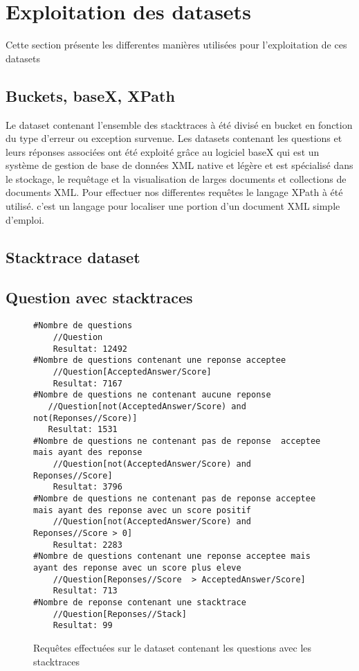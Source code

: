 \section{Exploitation des datasets}
Cette section présente les differentes manières utilisées pour l'exploitation de ces datasets
\subsection{Buckets, baseX, XPath}
Le dataset contenant l'ensemble des stacktraces à été divisé en bucket en fonction du type d'erreur ou exception survenue.
Les datasets contenant les questions et leurs réponses associées ont été exploité grâce au logiciel baseX qui  est un système de gestion de base de données XML native et légère et est spécialisé dans le stockage, le requêtage et la visualisation de larges documents et collections de documents XML.
Pour effectuer nos differentes requêtes le langage XPath à été utilisé. c'est un langage pour localiser une portion d'un document XML simple d'emploi.

\subsection{Stacktrace dataset}
\subsection{Question avec stacktraces}
\begin{figure}
\begin{lstlisting}
#Nombre de questions
    //Question
    Resultat: 12492
#Nombre de questions contenant une reponse acceptee
    //Question[AcceptedAnswer/Score]
    Resultat: 7167
#Nombre de questions ne contenant aucune reponse
   //Question[not(AcceptedAnswer/Score) and not(Reponses//Score)]
   Resultat: 1531
#Nombre de questions ne contenant pas de reponse  acceptee mais ayant des reponse
    //Question[not(AcceptedAnswer/Score) and Reponses//Score]
    Resultat: 3796
#Nombre de questions ne contenant pas de reponse acceptee mais ayant des reponse avec un score positif
    //Question[not(AcceptedAnswer/Score) and Reponses//Score > 0] 
    Resultat: 2283
#Nombre de questions contenant une reponse acceptee mais ayant des reponse avec un score plus eleve
    //Question[Reponses//Score  > AcceptedAnswer/Score]
    Resultat: 713
#Nombre de reponse contenant une stacktrace
    //Question[Reponses//Stack]
    Resultat: 99
\end{lstlisting}
\caption{Requêtes effectuées sur le dataset contenant les questions avec les stacktraces}
\label{code:resultatAvecStack}
\end{figure}

